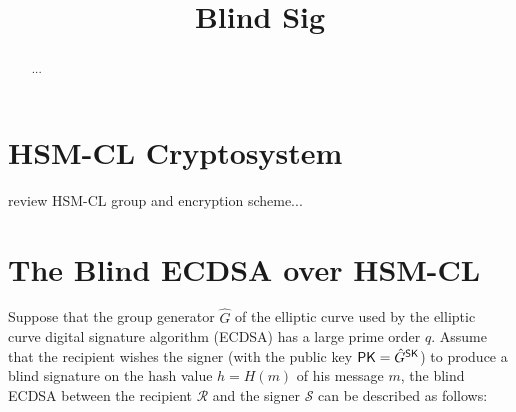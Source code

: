 \documentclass[runningheads]{llncs}
\newcommand{\SK}{{\sf SK}}
\newcommand{\PK}{{\sf PK}}
\begin{document}
	
	
	\title{Blind Sig}
	
	
\author{}
\institute{}
	
	\maketitle              %
	
	\begin{abstract}
...
		
	\end{abstract}
	
	\section{HSM-CL Cryptosystem}
	review HSM-CL group and encryption scheme...
	
	\section{The Blind ECDSA over HSM-CL}
Suppose that the group generator $\hat{G}$ of the elliptic curve used by the elliptic curve digital signature algorithm (ECDSA) has a large prime order $q$. Assume that the recipient wishes the signer (with the public key $\PK = \hat{G}^\SK$) to produce a blind signature on the hash value $h = H(m)$ of his message $m$, the blind ECDSA between the recipient $\mathcal{R}$ and the signer $\mathcal{S}$ can be described as follows:
\end{document}

